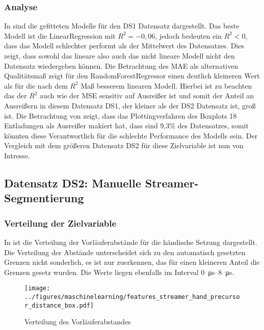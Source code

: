 \subsubsection{Analyse}
\label{sec:ds1ana}
In  sind die gefitteten Modelle für den DS1 Datensatz dargestellt. Das beste Modell ist die LinearRegression mit \(R^2 = -0,06\), jedoch bedeuten ein \(R^2 < 0\), dass das Modell schlechter performt als der Mittelwert des Datensatzes. Dies zeigt, dass sowohl das lineare also auch das nicht lineare Modell nicht den Datensatz wiedergeben können. Die Betrachtung des MAE als alternativen Qualitätsmaß zeigt für den RandomForestRegressor einen deutlich kleineren Wert als für die nach dem \(R^2\) Maß besserem linearen Modell. Hierbei ist zu beachten das der \(R^2\) auch wie der MSE sensitiv auf Ausreißer ist und somit der Anteil an Ausreißern in diesem Datensatz DS1, der kleiner als der DS2 Datensatz ist, groß ist. Die Betrachtung von  zeigt, dass das Plottingverfahren des Boxplots 18 Entladungen als Ausreißer makiert hat, dass sind 9,3\% des Datensatzes, somit könnten diese Verantwortlich für die schlechte Performance des Modells sein. Der Vergleich mit dem größeren Datensatz DS2 für diese Zielvariable ist nun von Intresse.

\subsection{Datensatz DS2: Manuelle Streamer-Segmentierung}

\subsubsection{Verteilung der Zielvariable}

In  ist die Verteilung der Vorläuferabstände für die händische Setzung dargestellt. Die Verteilung der Abstände unterscheidet sich zu den automatisch gesetzten Grenzen nicht sonderlich, es ist nur zuerkennen, das für einen kleineren Anteil die Grenzen gesetz wurden. Die Werte liegen ebenfalls im Interval \SIrange{0}{8}{\micro\second}. 
\begin{figure}[H]
    \centering
      \texttt{[image: ../figures/maschinelearning/features\_streamer\_hand\_precursor\_distance\_box.pdf]}
      \caption{Verteilung des Vorläuferabstandes}
      \label{fig:streamer_hand_prec_distance_box}
\end{figure}

